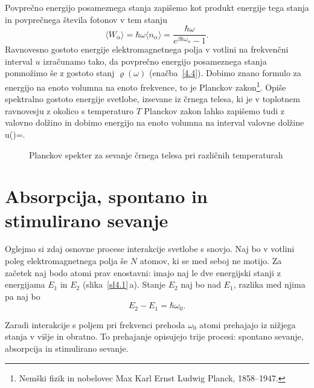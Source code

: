 Povprečno energijo posameznega stanja zapišemo kot produkt energije tega stanja in 
povprečnega števila fotonov v tem stanju
\begin{equation}
\langle W_{\alpha}\rangle = \hbar \omega \langle n_\alpha \rangle
= \frac{\hbar \omega}{e^{\beta\hbar\omega_{\alpha}}-1}.
\end{equation}
Ravnovesno gostoto energije elektromagnetnega polja v votlini na
frekvenčni interval $u$ izračunamo tako, da povprečno energijo posameznega
stanja pomnožimo še z gostoto stanj $\varrho (\omega)$ 
(enačba~\ref{4.4}). Dobimo znano formulo za energijo na enoto volumna na enoto frekvence, 
to je Planckov 
zakon\footnote{Nemški fizik in nobelovec Max Karl Ernst Ludwig Planck, 1858--1947.}.
Opiše spektralno gostoto energije svetlobe, izsevane iz črnega telesa, ki je v toplotnem ravnovesju z 
okolico s temperaturo $T$
Planckov zakon lahko zapišemo tudi z valovno dolžino in dobimo energijo na enoto volumna
na interval valovne dolžine
\beq
u(\lambda)=.
\eeq

\begin{figure}[h]
\centering
\def\svgwidth{100truemm} 

\caption{Planckov spekter za sevanje črnega telesa pri različnih temperaturah}
\label{fig:Planck}
\end{figure}

\section{Absorpcija, spontano in stimulirano sevanje}
Oglejmo si zdaj osnovne procese interakcije svetlobe s snovjo. Naj
bo v votlini poleg elektromagnetnega polja še $N$ atomov, ki se med
seboj ne motijo. Za začetek naj bodo atomi prav enostavni:
imajo naj le dve energijski stanji z energijama $E_{1}$ in $E_{2}$ (slika~\ref{sl4.1}\,a). 
Stanje $E_2$ naj bo nad $E_1$, razlika med njima pa naj bo
\begin{equation}
 E_2 - E_1 = \hbar \omega_0.
\end{equation}

Zaradi interakcije s poljem pri frekvenci prehoda $\omega_{0}$
atomi prehajajo iz nižjega stanja v višje in obratno. To prehajanje opisujejo trije procesi: 
spontano sevanje, absorpcija in stimulirano sevanje.

